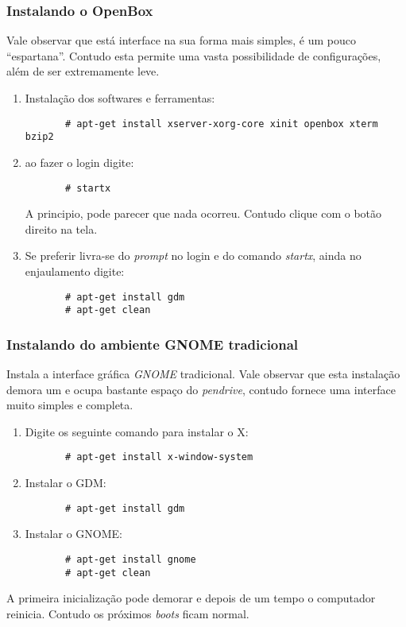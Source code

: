 \documentclass[a4paper,10pt]{article}
\begin{document}
    \subsubsection{Instalando o OpenBox}
      Vale observar que está interface na sua forma mais simples, é um pouco 
      ``espartana''. Contudo esta permite uma vasta possibilidade de configurações, 
      além de ser extremamente leve.
      \begin{enumerate}
	\item Instalação dos softwares e ferramentas:
	  \begin{lstlisting}
	   # apt-get install xserver-xorg-core xinit openbox xterm bzip2
	  \end{lstlisting}
	\item ao fazer o login digite:
	  \begin{lstlisting}
	   # startx
	  \end{lstlisting}
	  A principio, pode parecer que nada ocorreu. Contudo clique com o botão direito na tela.
	\item Se preferir livra-se do \emph{prompt} no login e do comando \emph{startx}, ainda no 
	  enjaulamento digite:
	  \begin{lstlisting}
	   # apt-get install gdm
	   # apt-get clean
	  \end{lstlisting}

      \end{enumerate}
    \subsubsection{Instalando do ambiente GNOME tradicional}
      Instala a interface gráfica \emph{GNOME} tradicional. Vale observar que esta instalação 
      demora um e ocupa bastante espaço do \emph{pendrive}, contudo fornece uma interface muito 
      simples e completa.
      \begin{enumerate}
	\item Digite os seguinte comando para instalar o X:
	  \begin{lstlisting}
	   # apt-get install x-window-system
	  \end{lstlisting}
	\item Instalar o GDM:
	  \begin{lstlisting}
	   # apt-get install gdm
	  \end{lstlisting}
	\item Instalar o GNOME:
	  \begin{lstlisting}
	   # apt-get install gnome 
	   # apt-get clean
	  \end{lstlisting}
      \end{enumerate}
      A primeira inicialização pode demorar e depois de um tempo o computador reinicia. Contudo 
      os próximos \emph{boots} ficam normal.
\end{document}

